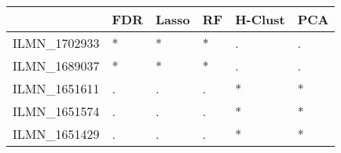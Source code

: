 \begin{table}[ht]
\centering
\begin{tabular}{rlllll}
  \hline
 & FDR & Lasso & RF & H-Clust & PCA \\ 
  \hline
ILMN\_1702933 & * & * & * & . & . \\ 
  ILMN\_1689037 & * & * & * & . & . \\ 
  ILMN\_1651611 & . & . & . & * & * \\ 
  ILMN\_1651574 & . & . & . & * & * \\ 
  ILMN\_1651429 & . & . & . & * & * \\ 

\end{tabular}
\end{table}
